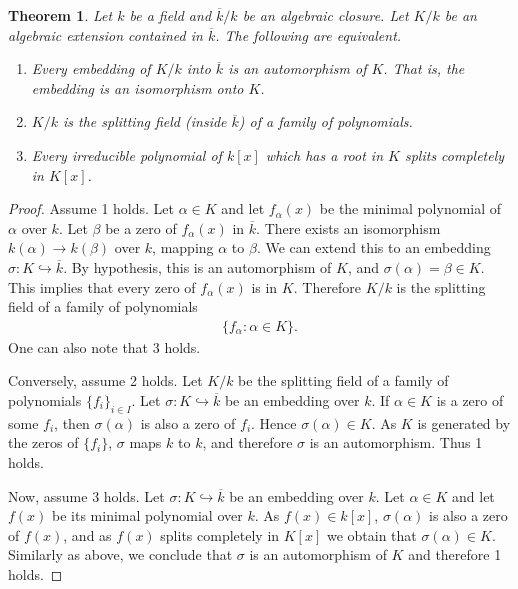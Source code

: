 \documentclass[12pt]{report}
\theoremstyle{plain}
\newtheorem{theorem}{Theorem}[section]
\theoremstyle{remark}
\theoremstyle{definition}
\begin{document}
\begin{theorem}
    Let $k$ be a field and $\overline{k}/k$ be an algebraic closure. Let $K/k$ be an algebraic extension contained in $\overline{k}$. The following are equivalent.
    \begin{enumerate}
        \item Every embedding of $K/k$ into $\overline{k}$ is an automorphism of $K$. That is, the embedding is an isomorphism onto $K$.
        \item $K/k$ is the splitting field (inside $\overline{k}$) of a family of polynomials.
        \item Every irreducible polynomial of $k[x]$ which has a root in $K$ splits completely in $K[x]$.
    \end{enumerate}
\end{theorem}
\begin{proof}
    Assume 1 holds. Let $\alpha\in K$ and let $f_\alpha(x)$ be the minimal polynomial of $\alpha$ over $k$. Let $\beta$ be a zero of $f_\alpha(x)$ in $\overline{k}$. There exists an isomorphism $k(\alpha)\rightarrow k(\beta)$ over $k$, mapping $\alpha$ to $\beta$. We can extend this to an embedding $\sigma:K\hookrightarrow\overline{k}$. By hypothesis, this is an automorphism of $K$, and $\sigma(\alpha)=\beta\in K$. This implies that every zero of $f_\alpha(x)$ is in $K$. Therefore $K/k$ is the splitting field of a family of polynomials
    \begin{align*}
        \{f_\alpha:\alpha\in K\}.
    \end{align*}
    One can also note that 3 holds.

    Conversely, assume 2 holds. Let $K/k$ be the splitting field of a family of polynomials $\{f_i\}_{i\in I}$. Let $\sigma:K\hookrightarrow\overline{k}$ be an embedding over $k$. If $\alpha\in K$ is a zero of some $f_i$, then $\sigma(\alpha)$ is also a zero of $f_i$. Hence $\sigma(\alpha)\in K$. As $K$ is generated by the zeros of $\{f_i\}$, $\sigma$ maps $k$ to $k$, and therefore $\sigma$ is an automorphism. Thus 1 holds.

    Now, assume 3 holds. Let $\sigma:K\hookrightarrow\overline{k}$ be an embedding over $k$. Let $\alpha\in K$ and let $f(x)$ be its minimal polynomial over $k$. As $f(x)\in k[x]$, $\sigma(\alpha)$ is also a zero of $f(x)$, and as $f(x)$ splits completely in $K[x]$ we obtain that $\sigma(\alpha)\in K$. Similarly as above, we conclude that $\sigma$ is an automorphism of $K$ and therefore 1 holds.
\end{proof}
\end{document}
